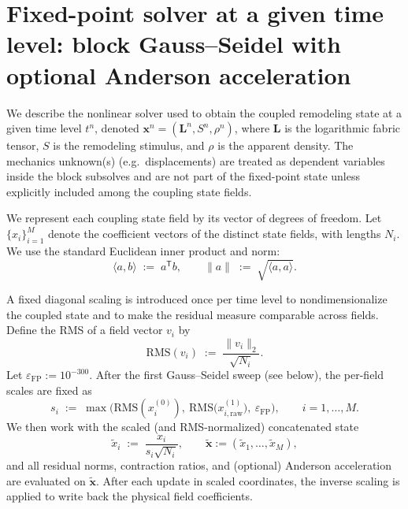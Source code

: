 \section*{Fixed-point solver at a given time level: block Gauss--Seidel with optional Anderson acceleration}
\label{sec:fp-aa}

We describe the nonlinear solver used to obtain the coupled remodeling state at a given time level $t^n$, denoted
$\mathbf{x}^n=(\mathbf{L}^n,S^n,\rho^n)$, where $\mathbf{L}$ is the logarithmic fabric tensor, $S$ is the remodeling stimulus, and $\rho$ is the apparent density.
The mechanics unknown(s) (e.g.\ displacements) are treated as dependent variables inside the block subsolves and are not part of the fixed-point state unless explicitly included among the coupling state fields.

We represent each coupling state field by its vector of degrees of freedom. Let $\{x_i\}_{i=1}^{M}$ denote the coefficient vectors of the distinct state fields, with lengths $N_i$. We use the standard Euclidean inner product and norm:
\[
\langle a,b\rangle \;:=\; a^{\mathsf{T}} b,
\qquad 
\|a\| \;:=\; \sqrt{\langle a,a\rangle}.
\]

A fixed diagonal scaling is introduced once per time level to nondimensionalize the coupled state and to make the residual measure comparable across fields. Define the RMS of a field vector $v_i$ by
\[
\mathrm{RMS}(v_i)\;:=\;\frac{\|v_i\|_2}{\sqrt{N_i}}.
\]
Let $\varepsilon_{\mathrm{FP}}:=10^{-300}$. After the first Gauss--Seidel sweep (see below), the per-field scales are fixed as
\begin{equation}\label{eq:fp-scales}
s_i \;:=\; \max\!\Big(\mathrm{RMS}(x_i^{(0)}),\ \mathrm{RMS}\big(x_{i,\mathrm{raw}}^{(1)}\big),\ \varepsilon_{\mathrm{FP}}\Big),
\qquad i=1,\dots,M.
\end{equation}
We then work with the scaled (and RMS-normalized) concatenated state
\[
\widetilde{x}_i \;:=\; \frac{x_i}{s_i\sqrt{N_i}}, \qquad 
\widetilde{\mathbf{x}} := (\widetilde{x}_1,\dots,\widetilde{x}_M),
\]
and all residual norms, contraction ratios, and (optional) Anderson acceleration are evaluated on $\widetilde{\mathbf{x}}$.
After each update in scaled coordinates, the inverse scaling is applied to write back the physical field coefficients.

